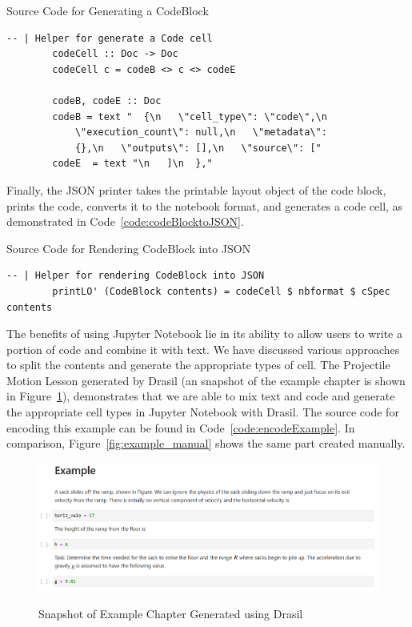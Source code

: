 \begin{listing}[h!]
	\caption{Source Code for Generating a CodeBlock}
	\label{code:codeBlock}
	\begin{lstlisting}[language=haskell1]		
		-- | Helper for generate a Code cell
		codeCell :: Doc -> Doc
		codeCell c = codeB <> c <> codeE
		
		codeB, codeE :: Doc
		codeB = text "  {\n   \"cell_type\": \"code\",\n   
			\"execution_count\": null,\n   \"metadata\": 
			{},\n   \"outputs\": [],\n   \"source\": [" 
		codeE  = text "\n   ]\n  },"
		\end{lstlisting}
\end{listing}

Finally, the JSON printer takes the printable layout object of the code block, 
prints the code, converts it to the notebook format, and generates a code cell, 
as demonstrated in Code~\ref{code:codeBlocktoJSON}.

\begin{listing}[h!]
	\caption{Source Code for Rendering CodeBlock into JSON}
	\label{code:codeBlocktoJSON}
	\begin{lstlisting}[language=haskell1]
		-- | Helper for rendering CodeBlock into JSON
		printLO' (CodeBlock contents) = codeCell $ nbformat $ cSpec contents
	\end{lstlisting}
\end{listing}

The benefits of using Jupyter Notebook lie in its ability to allow users to 
write a portion of code and combine it with text. We have discussed various 
approaches to split the contents and generate the appropriate types of cell. 
The Projectile Motion Lesson generated by Drasil (an snapshot of the example 
chapter is shown in Figure~\ref{fig:example_drasil}), demonstrates that we are 
able to mix text and code and generate the appropriate cell types in Jupyter 
Notebook with Drasil. The source code for encoding this example can be found in 
Code~\ref{code:encodeExample}. In comparison, Figure~\ref{fig:example_manual} 
shows the same part created manually.

\begin{figure}[h!]
	\caption{Snapshot of Example Chapter Generated using Drasil}
	\includegraphics[width=1\textwidth]{figures/example_drasil.png}
	\label{fig:example_drasil}
\end{figure}

